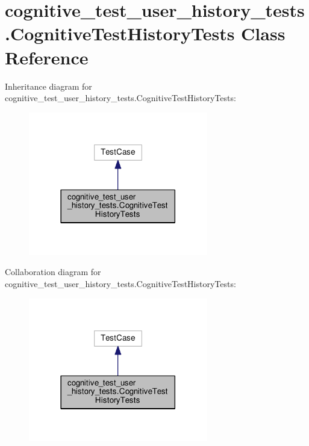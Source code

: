 \hypertarget{classcognitive__test__user__history__tests_1_1CognitiveTestHistoryTests}{\section{cognitive\-\_\-test\-\_\-user\-\_\-history\-\_\-tests.\-Cognitive\-Test\-History\-Tests Class Reference}
\label{classcognitive__test__user__history__tests_1_1CognitiveTestHistoryTests}
}


Inheritance diagram for cognitive\-\_\-test\-\_\-user\-\_\-history\-\_\-tests.\-Cognitive\-Test\-History\-Tests\-:
\nopagebreak
\begin{figure}[H]
\begin{center}
\leavevmode
\includegraphics[width=222pt]{classcognitive__test__user__history__tests_1_1CognitiveTestHistoryTests__inherit__graph}
\end{center}
\end{figure}


Collaboration diagram for cognitive\-\_\-test\-\_\-user\-\_\-history\-\_\-tests.\-Cognitive\-Test\-History\-Tests\-:
\nopagebreak
\begin{figure}[H]
\begin{center}
\leavevmode
\includegraphics[width=222pt]{classcognitive__test__user__history__tests_1_1CognitiveTestHistoryTests__coll__graph}
\end{center}
\end{figure}
